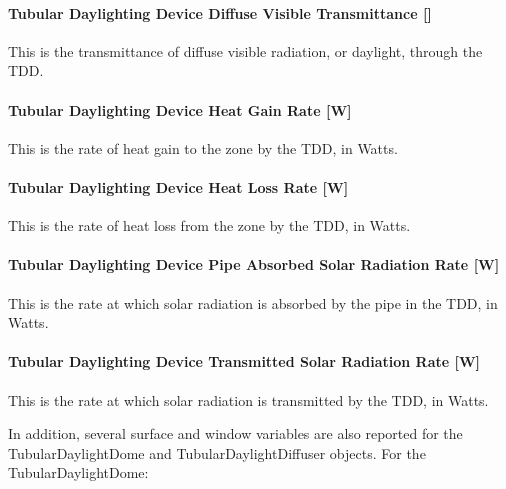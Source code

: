 \paragraph{Tubular Daylighting Device Diffuse Visible Transmittance {[]}}\label{tubular-daylighting-device-diffuse-visible-transmittance}

This is the transmittance of diffuse visible radiation, or daylight, through the TDD.

\paragraph{Tubular Daylighting Device Heat Gain Rate {[}W{]}}\label{tubular-daylighting-device-heat-gain-rate-w}

This is the rate of heat gain to the zone by the TDD, in Watts.

\paragraph{Tubular Daylighting Device Heat Loss Rate {[}W{]}}\label{tubular-daylighting-device-heat-loss-rate-w}

This is the rate of heat loss from the zone by the TDD, in Watts.

\paragraph{Tubular Daylighting Device Pipe Absorbed Solar Radiation Rate {[}W{]}}\label{tubular-daylighting-device-pipe-absorbed-solar-radiation-rate-w}

This is the rate at which solar radiation is absorbed by the pipe in the TDD, in Watts.

\paragraph{Tubular Daylighting Device Transmitted Solar Radiation Rate {[}W{]}}\label{tubular-daylighting-device-transmitted-solar-radiation-rate-w}

This is the rate at which solar radiation is transmitted by the TDD, in Watts.

In addition, several surface and window variables are also reported for the TubularDaylightDome and TubularDaylightDiffuser objects. For the TubularDaylightDome:

